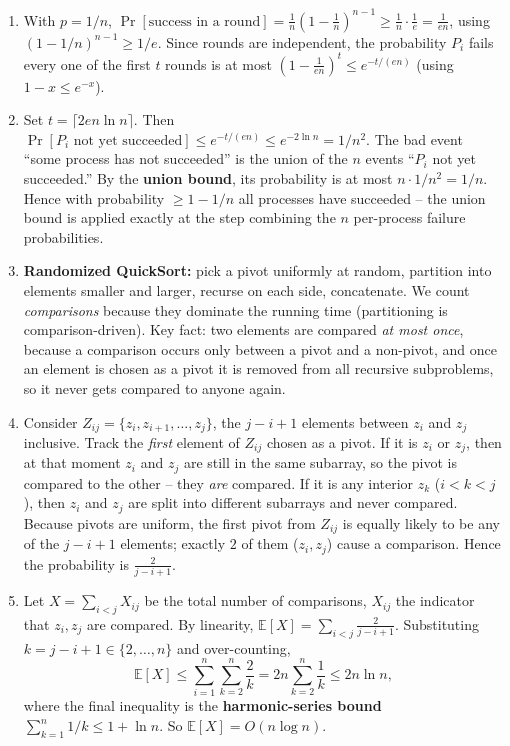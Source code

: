 \documentclass[11pt]{article}
\begin{document}
\begin{enumerate}[label=\textbf{A\arabic*.}, leftmargin=2.2em]
\item With $p = 1/n$, $\Pr[\text{success in a round}] = \frac1n(1 - \frac1n)^{n-1} \ge
\frac1n\cdot\frac1e = \frac{1}{en}$, using $(1-1/n)^{n-1}\ge 1/e$. Since rounds are
independent, the probability $P_i$ fails every one of the first $t$ rounds is at most
$(1 - \frac{1}{en})^t \le e^{-t/(en)}$ (using $1 - x \le e^{-x}$).

\item Set $t = \lceil 2en\ln n\rceil$. Then $\Pr[P_i \text{ not yet succeeded}] \le
e^{-t/(en)} \le e^{-2\ln n} = 1/n^2$. The bad event ``some process has not succeeded'' is
the union of the $n$ events ``$P_i$ not yet succeeded.'' By the \textbf{union bound}, its
probability is at most $n\cdot 1/n^2 = 1/n$. Hence with probability $\ge 1 - 1/n$ all
processes have succeeded -- the union bound is applied exactly at the step combining the $n$
per-process failure probabilities.

\item \textbf{Randomized QuickSort:} pick a pivot uniformly at random, partition into
elements smaller and larger, recurse on each side, concatenate. We count \emph{comparisons}
because they dominate the running time (partitioning is comparison-driven). Key fact: two
elements are compared \emph{at most once}, because a comparison occurs only between a pivot
and a non-pivot, and once an element is chosen as a pivot it is removed from all recursive
subproblems, so it never gets compared to anyone again.

\item Consider $Z_{ij} = \{z_i, z_{i+1}, \ldots, z_j\}$, the $j-i+1$ elements between $z_i$
and $z_j$ inclusive. Track the \emph{first} element of $Z_{ij}$ chosen as a pivot. If it is
$z_i$ or $z_j$, then at that moment $z_i$ and $z_j$ are still in the same subarray, so the
pivot is compared to the other -- they \emph{are} compared. If it is any interior $z_k$
($i<k<j$), then $z_i$ and $z_j$ are split into different subarrays and never compared.
Because pivots are uniform, the first pivot from $Z_{ij}$ is equally likely to be any of
the $j-i+1$ elements; exactly $2$ of them ($z_i, z_j$) cause a comparison. Hence the
probability is $\frac{2}{j-i+1}$.

\item Let $X = \sum_{i<j} X_{ij}$ be the total number of comparisons, $X_{ij}$ the
indicator that $z_i, z_j$ are compared. By linearity, $\mathbb{E}[X] = \sum_{i<j}
\frac{2}{j-i+1}$. Substituting $k = j-i+1 \in \{2,\ldots,n\}$ and over-counting,
\[
\mathbb{E}[X] \le \sum_{i=1}^{n}\sum_{k=2}^{n}\frac{2}{k} = 2n\sum_{k=2}^{n}\frac1k \le 2n\ln n,
\]
where the final inequality is the \textbf{harmonic-series bound} $\sum_{k=1}^n 1/k \le
1 + \ln n$. So $\mathbb{E}[X] = O(n\log n)$.


\end{enumerate}
\end{document}

